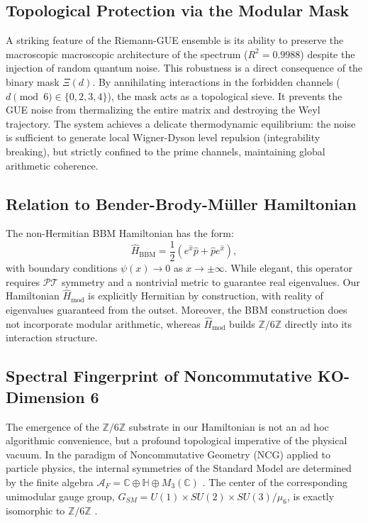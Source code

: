 \documentclass[prl,aps,floatfix,superscriptaddress,10pt]{revtex4-2}
\newcommand{\Zmod}{\mathbb{Z}/6\mathbb{Z}}
\begin{document}
\subsection{Topological Protection via the Modular Mask}

A striking feature of the Riemann-GUE ensemble is its ability to preserve the macroscopic macroscopic architecture of the spectrum ($R^2 = 0.9988$) despite the injection of random quantum noise.
This robustness is a direct consequence of the binary mask $\Xi(d)$.
By annihilating interactions in the forbidden channels ($d \pmod 6 \in \{0, 2, 3, 4\}$), the mask acts as a topological sieve.
It prevents the GUE noise from thermalizing the entire matrix and destroying the Weyl trajectory.
The system achieves a delicate thermodynamic equilibrium: the noise is sufficient to generate local Wigner-Dyson level repulsion (integrability breaking), but strictly confined to the prime channels, maintaining global arithmetic coherence.

\subsection{Relation to Bender-Brody-M\"uller Hamiltonian}

The non-Hermitian BBM Hamiltonian \cite{Bender2017} has the form:
\begin{equation}
\hat{H}_{\text{BBM}} = \frac12 (e^{\hat{x}} \hat{p} + \hat{p} e^{\hat{x}}),
\end{equation}
with boundary conditions $\psi(x) \to 0$ as $x \to \pm\infty$. While elegant, this operator requires $\mathcal{PT}$ symmetry and a nontrivial metric to guarantee real eigenvalues. Our Hamiltonian $\hat{H}_{\text{mod}}$ is explicitly Hermitian by construction, with reality of eigenvalues guaranteed from the outset. Moreover, the BBM construction does not incorporate modular arithmetic, whereas $\hat{H}_{\text{mod}}$ builds $\Zmod$ directly into its interaction structure.

\subsection{Spectral Fingerprint of Noncommutative KO-Dimension 6}

The emergence of the $\mathbb{Z}/6\mathbb{Z}$ substrate in our Hamiltonian is not an ad hoc algorithmic convenience, but a profound topological imperative of the physical vacuum. In the paradigm of Noncommutative Geometry (NCG) applied to particle physics, the internal symmetries of the Standard Model are determined by the finite algebra $\mathcal{A}_F = \mathbb{C} \oplus \mathbb{H} \oplus M_3(\mathbb{C})$ \cite{Chamseddine2007, Connes2008}. The center of the corresponding unimodular gauge group, $G_{SM} = U(1) \times SU(2) \times SU(3) / \mu_6$, is exactly isomorphic to $\mathbb{Z}/6\mathbb{Z}$ \cite{Connes2008}.
\end{document}
